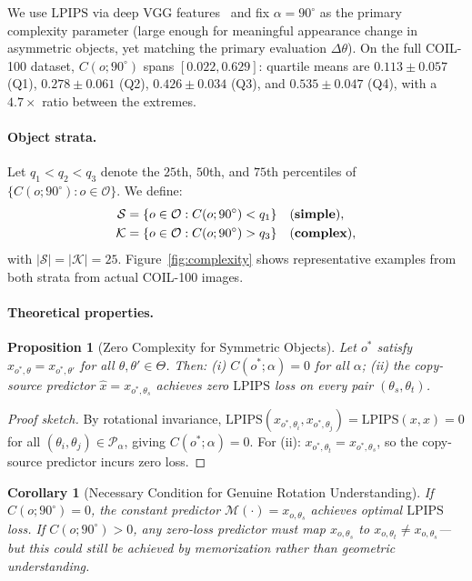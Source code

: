 \documentclass[11pt]{article}
\newtheorem{proposition}{Proposition}
\newtheorem{corollary}{Corollary}[proposition]
\newcommand{\cP}{\mathcal{P}}
\newcommand{\cO}{\mathcal{O}}
\newcommand{\Dtheta}{\Delta\theta}
\newcommand{\lpips}{\mathrm{LPIPS}}
\begin{document}
We use $\lpips$ via deep VGG features~\cite{zhang2018lpips} and fix
$\alpha = 90^{\circ}$ as the primary complexity parameter (large enough for
meaningful appearance change in asymmetric objects, yet matching the primary
evaluation $\Dtheta$). On the full COIL-100 dataset, $C(o;90^{\circ})$ spans
$[0.022, 0.629]$: quartile means are $0.113 \pm 0.057$ (Q1), $0.278 \pm 0.061$
(Q2), $0.426 \pm 0.034$ (Q3), and $0.535 \pm 0.047$ (Q4), with a $4.7\times$
ratio between the extremes.

\paragraph{Object strata.}
Let $q_1 < q_2 < q_3$ denote the $25$th, $50$th, and $75$th percentiles of
$\{C(o;90^{\circ}) : o \in \cO\}$. We define:
\begin{align}
  \mathcal{S} &= \{o \in \cO : C(o;90^{\circ}) < q_1\}
    \quad\text{(\textbf{simple})},\label{eq:simple}\\
  \mathcal{K} &= \{o \in \cO : C(o;90^{\circ}) > q_3\}
    \quad\text{(\textbf{complex})},\label{eq:complex}
\end{align}
with $|\mathcal{S}| = |\mathcal{K}| = 25$. Figure~\ref{fig:complexity} shows
representative examples from both strata from actual COIL-100 images.

\paragraph{Theoretical properties.}

\begin{proposition}[Zero Complexity for Symmetric Objects]
  \label{prop:symmetric}
  Let $o^*$ satisfy $x_{o^*,\theta} = x_{o^*,\theta'}$ for all
  $\theta, \theta' \in \Theta$. Then: (i) $C(o^*;\alpha) = 0$ for all
  $\alpha$; (ii) the copy-source predictor $\hat{x} = x_{o^*,\theta_s}$
  achieves zero $\lpips$ loss on every pair $(\theta_s, \theta_t)$.
\end{proposition}

\begin{proof}[Proof sketch]
  By rotational invariance, $\lpips(x_{o^*,\theta_i}, x_{o^*,\theta_j}) =
  \lpips(x,x) = 0$ for all $(\theta_i, \theta_j) \in \cP_\alpha$, giving
  $C(o^*;\alpha) = 0$. For (ii): $x_{o^*,\theta_t} = x_{o^*,\theta_s}$, so
  the copy-source predictor incurs zero loss.
\end{proof}

\begin{corollary}[Necessary Condition for Genuine Rotation Understanding]
  \label{cor:necessary}
  If $C(o;90^{\circ}) = 0$, the constant predictor $\mathcal{M}(\cdot) =
  x_{o,\theta_s}$ achieves optimal $\lpips$ loss. If $C(o;90^{\circ}) > 0$,
  any zero-loss predictor must map $x_{o,\theta_s}$ to $x_{o,\theta_t} \neq
  x_{o,\theta_s}$---but this could still be achieved by memorization rather
  than geometric understanding.
\end{corollary}
\end{document}
